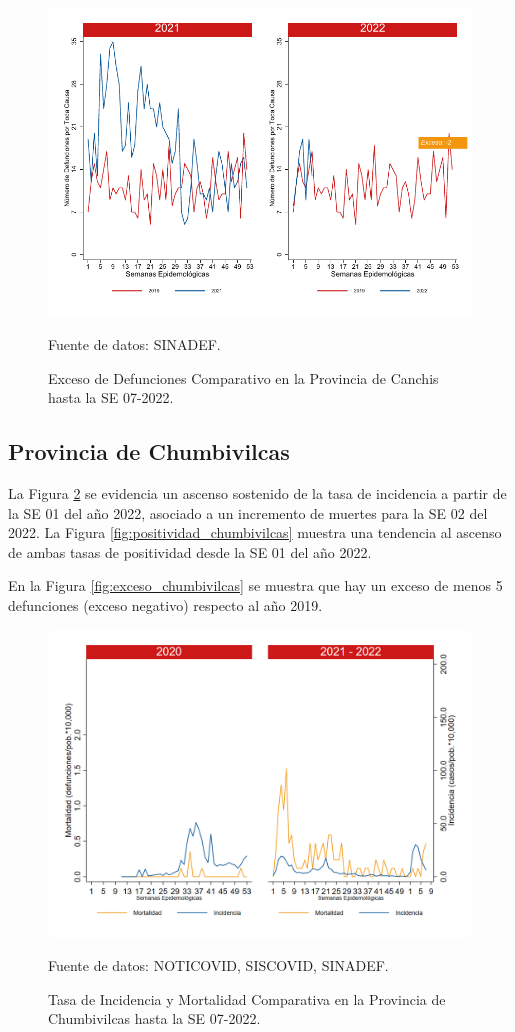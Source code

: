 \documentclass[12pt,a4paper,openany]{book}
\begin{document}
		\begin{figure}[h]
			\caption{Exceso de Defunciones Comparativo en la Provincia de Canchis hasta la SE 07-2022.}\label{fig:exceso_canchis}
			\begin{center}
				\includegraphics[width=0.7\linewidth]{../figuras/exceso_5.pdf}
			\end{center}
			{\footnotesize {Fuente de datos: SINADEF.}}
		\end{figure}
		
		\clearpage
		
		\subsection*{Provincia de Chumbivilcas}
		\noindent La Figura \ref{fig:inc_mort_chumbivilcas} se evidencia un ascenso sostenido de la tasa de incidencia a partir de la SE 01 del año 2022, asociado a un incremento de muertes para la SE 02 del 2022.  
		\noindent La Figura \ref{fig:positividad_chumbivilcas} muestra una tendencia al ascenso de ambas tasas de positividad desde la SE 01 del año 2022. 
		
		En la Figura \ref{fig:exceso_chumbivilcas} se muestra que hay un exceso de menos 5 defunciones (exceso negativo) respecto al año 2019.
		
		\begin{figure}[h]
			\caption{Tasa de Incidencia y Mortalidad Comparativa en la Provincia de Chumbivilcas hasta la SE 07-2022.}\label{fig:inc_mort_chumbivilcas}
			\begin{center}
				\includegraphics[width=0.7\linewidth]{../figuras/incidencia_mortalidad_20_21_6.png}
			\end{center}
			{\footnotesize {Fuente de datos: NOTICOVID, SISCOVID, SINADEF.}}
		\end{figure}
		
\end{document}

